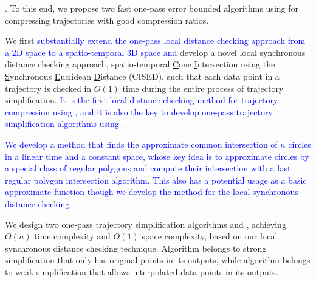 . To this end, we propose two fast one-pass error bounded \lsa algorithms using \sed for compressing trajectories with good compression ratios. %

 We first \textcolor{blue}{substantially extend the one-pass local distance checking approach from a 2D space to a spatio-temporal 3D space and} develop a novel local synchronous distance checking approach, \ie spatio-temporal \underline{C}one \underline{I}ntersection using the \underline{S}ynchronous \underline{E}uclidean \underline{D}istance (CISED), such that each data point in a trajectory is checked in $O(1)$ time during the entire process of trajectory simplification.
\textcolor{blue}{It is the first local distance checking method for trajectory compression using \sed, and it is also the key to develop one-pass trajectory simplification algorithms using \sed.}



 \textcolor{blue}{We develop a method that finds the approximate common intersection of $n$ circles in a linear time and a constant space, whose key idea is to approximate circles by a special class of regular polygons and compute their intersection with a fast regular polygon intersection algorithm. This also has a potential usage as a basic approximate function though we develop the method for the local synchronous distance checking.}



 We design two one-pass trajectory simplification algorithms \cist and \cista, achieving $O(n)$ time complexity and $O(1)$ space complexity, based on our local synchronous distance checking technique.
Algorithm \cist belongs to strong simplification that only has original points in its outputs, while algorithm \cista belongs to weak simplification that allows interpolated data points in its outputs.


